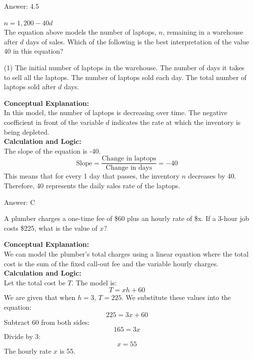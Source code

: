 \documentclass[11pt,paper=a4,answers]{exam}
\begin{document}
\begin{questions}
\begin{solution}
\vspace{15pt}
Answer: \colorbox{yellow!100}{4.5}
\end{solution}

\question
$n = 1,200 - 40d$ \\
The equation above models the number of laptops, $n$, remaining in a warehouse after $d$ days of sales. Which of the following is the best interpretation of the value 40 in this equation?
\begin{tasks}(1)
    \task The initial number of laptops in the warehouse.
    \task The number of days it takes to sell all the laptops.
    \task The number of laptops sold each day.
    \task The total number of laptops sold after $d$ days.
\end{tasks}

\begin{solution}
\textbf{Conceptual Explanation:} \\
In this model, the number of laptops is decreasing over time. The negative coefficient in front of the variable $d$ indicates the rate at which the inventory is being depleted.
\\[10pt]
\textbf{Calculation and Logic:} \\
The slope of the equation is -40. 
\[\text{Slope} = \frac{\text{Change in laptops}}{\text{Change in days}} = -40\]
This means that for every 1 day that passes, the inventory $n$ decreases by 40. Therefore, 40 represents the daily sales rate of the laptops.

\vspace{15pt}
Answer: \colorbox{yellow!100}{C}
\end{solution}



\question
A plumber charges a one-time fee of \$60 plus an hourly rate of \$x. If a 3-hour job costs \$225, what is the value of $x$?

\begin{solution}
\textbf{Conceptual Explanation:} \\
We can model the plumber's total charges using a linear equation where the total cost is the sum of the fixed call-out fee and the variable hourly charges.
\\[10pt]
\textbf{Calculation and Logic:} \\
Let the total cost be $T$. The model is:
\[T = xh + 60\]
We are given that when $h = 3$, $T = 225$. We substitute these values into the equation:
\[225 = 3x + 60\]
Subtract 60 from both sides:
\[165 = 3x\]
Divide by 3:
\[x = 55\]
The hourly rate $x$ is 55.


\end{solution}
\end{questions}
\end{document}
